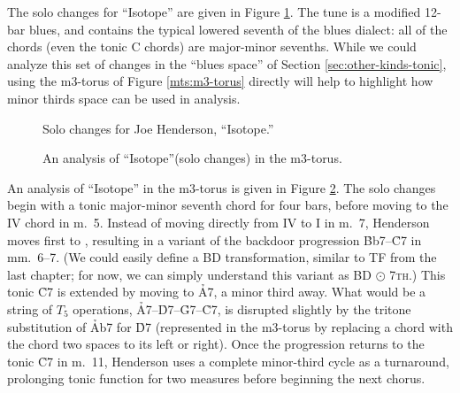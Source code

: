 The solo changes for ``Isotope'' are given in Figure
\ref{mts:isotope-solo-changes}. The tune is a modified 12-bar blues,
and contains the typical lowered seventh of the blues dialect: all of the
chords (even the tonic C chords) are major-minor sevenths. While we could
analyze this set of changes in the ``blues \tf space'' of Section
\ref{sec:other-kinds-tonic}, using the m3-torus of Figure \ref{mts:m3-torus}
directly will help to highlight how minor thirds space can be used in analysis.

\begin{figure}[tbp]
  \caption{Solo changes for Joe Henderson, ``Isotope.''}
  \label{mts:isotope-solo-changes}
\end{figure}

\begin{figure}[tbp]
  \caption{An analysis of ``Isotope''(solo changes) in the m3-torus.}
  \label{mts:isotope-torus}
\end{figure}

An analysis of ``Isotope'' in the m3-torus is given in Figure
\ref{mts:isotope-torus}. The solo changes begin with a tonic major-minor
seventh chord for four bars, before moving to the IV chord in m.~5. Instead of
moving directly from IV to I in m.~7, Henderson moves first to \Bflat,
resulting in a variant of the backdoor progression \h{Bb7}--\h{C7} in
mm.~6--7. (We could easily define a BD transformation, similar to
TF from the last chapter; for now, we can simply understand this
variant as BD $\odot$ \textsc{7th}.) This tonic \h{C7} is extended by moving
to \h{A7}, a minor third away. What would be a string of $T_5$ operations,
\h{A7}--\h{D7}--\h{G7}--\h{C7}, is disrupted slightly by the tritone
substitution of \h{Ab7} for \h{D7} (represented in the m3-torus by
replacing a chord with the chord two spaces to its left or right). Once the
progression returns to the tonic \h{C7} in m.~11, Henderson uses a complete
minor-third cycle as a turnaround, prolonging tonic function for two measures
before beginning the next chorus.


